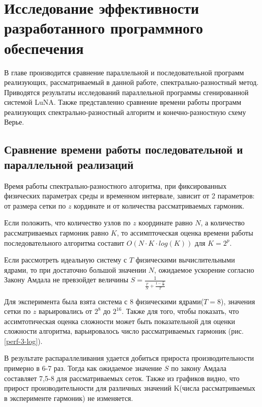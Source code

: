 \section{Исследование эффективности разработанного программного обеспечения}

В главе производится сравнение параллельной и последовательной программ реализующих,
рассматриваемый в данной работе, спектрально-разностный метод.
Приводятся результаты исследований параллельной программы сгенированной системой LuNA.
Также представленно сравнение времени работы программ реализующих спектрально-разностный алгоритм
и конечно-разностную схему Верье.

\subsection{Сравнение времени работы последовательной и параллельной реализаций}

Время работы спектрально-разностного алгоритма, при фиксированных физических параметрах среды и временном интервале,
зависит от 2 параметров: от размера сетки по $z$ кординате и от количества рассматриваемых гармоник.

Если положить, что количество узлов по $z$ координате равно $N$, а количество рассматриваемых гармоник равно $K$,
то ассимпточеская оценка времени работы последовательного алгоритма составит $O(N\cdot K \cdot log(K))$ для $K=2^p$.

Если рассмотреть идеальную систему с $T$ физическими вычислительными ядрами, то при достаточно большой значении $N$,
ожидаемое ускорение согласно Закону Амдала не превзойдет величины $S = \frac{1}{\frac{T}{N} + \frac{1-\frac{T}{N}}{T}}$

Для эксперимента была взята система с 8 физическими ядрами($T=8$), значения сетки по $z$ варьировались от $2^8$ до $2^{16}$.
Также для того, чтобы показать, что ассимтотическая оценка сложности может быть показательной для оценки сложности алгоритма,
варьировалось число рассматриваемых гармоник (рис. \ref{perf-3-log}).


В результате распараллеливания удается добиться прироста производительности примерно в 6-7 раз. Тогда как
ожидаемое значение $S$ по закону Амдала составляет 7,5-8 для рассматриваемых сеток. Также из графиков видно, что прирост
производительности для различных значений K(числа рассматриваемых в эксперименте гармоник) не изменяется.

